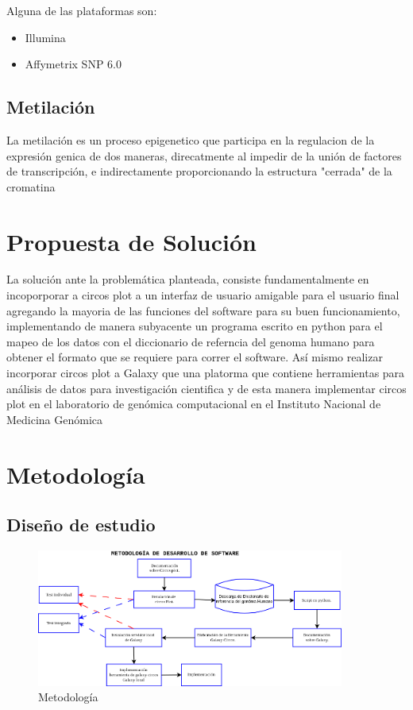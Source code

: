 \documentclass[12pt,letterpaper]{article}
\begin{document}
Alguna de las plataformas son:

\begin{itemize}
\item Illumina
\item Affymetrix SNP 6.0
\end{itemize}


\subsection{Metilación}
La metilación es un proceso epigenetico que participa en la regulacion de la expresión genica de dos maneras, direcatmente al impedir de la unión de factores de transcripción, e indirectamente proporcionando la estructura "cerrada" de la cromatina\cite{VallinPlous2007}

\section{Propuesta de Solución}
La solución ante la problemática planteada, consiste fundamentalmente en incoporporar a circos plot a un interfaz de usuario amigable para el usuario final agregando la mayoria de las funciones del software para su buen funcionamiento, implementando de manera subyacente un programa escrito en python para el mapeo de los datos con el diccionario de referncia del genoma humano para obtener el formato que se requiere para correr el software.
Así mismo realizar incorporar circos plot a Galaxy que una platorma que contiene herramientas para análisis de datos para investigación cientifica y de esta manera implementar circos plot en el laboratorio de genómica computacional en el Instituto Nacional de Medicina Genómica

\section{Metodología}
\subsection{Diseño de estudio}

\begin{figure}[H]
\begin{center}
\includegraphics[width=0.9\textwidth]{METODOLOGIA.png}
\end{center}
\caption{Metodología}
\end{figure}
\end{document}
